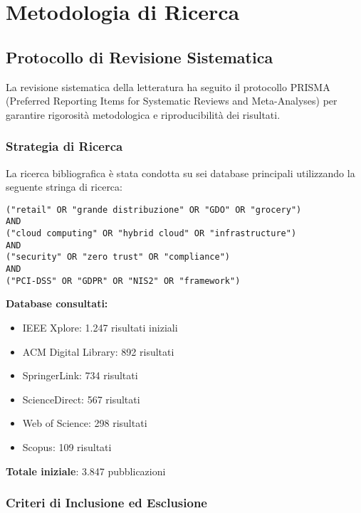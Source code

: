 \chapter{\texorpdfstring{Metodologia di Ricerca}{Appendice A - Metodologia di Ricerca}}
\label{app:metodologia}

\section{\texorpdfstring{Protocollo di Revisione Sistematica}{A.1 - Protocollo di Revisione Sistematica}}

La revisione sistematica della letteratura ha seguito il protocollo PRISMA (Preferred Reporting Items for Systematic Reviews and Meta-Analyses) per garantire rigorosità metodologica e riproducibilità dei risultati.

\subsection{\texorpdfstring{Strategia di Ricerca}{A.1.1 - Strategia di Ricerca}}

La ricerca bibliografica è stata condotta su sei database principali utilizzando la seguente stringa di ricerca:

\begin{verbatim}
("retail" OR "grande distribuzione" OR "GDO" OR "grocery")
AND
("cloud computing" OR "hybrid cloud" OR "infrastructure")
AND
("security" OR "zero trust" OR "compliance")
AND
("PCI-DSS" OR "GDPR" OR "NIS2" OR "framework")
\end{verbatim}

\textbf{Database consultati:}
\begin{itemize}
    \item IEEE Xplore: 1.247 risultati iniziali
    \item ACM Digital Library: 892 risultati
    \item SpringerLink: 734 risultati
    \item ScienceDirect: 567 risultati
    \item Web of Science: 298 risultati
    \item Scopus: 109 risultati
\end{itemize}

\textbf{Totale iniziale}: 3.847 pubblicazioni

\subsection{\texorpdfstring{Criteri di Inclusione ed Esclusione}{A.1.2 - Criteri di Inclusione ed Esclusione}}

